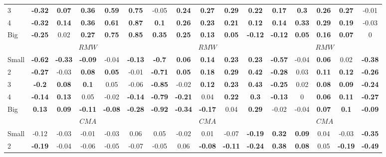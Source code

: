\begin{table}[H]
\begin{tabular}{lccccc|ccccc|ccccc}
3 & \textbf{-0.32} & \textbf{0.07} & \textbf{0.36} & \textbf{0.59} & \textbf{0.75} & -0.05 & \textbf{0.24} & \textbf{0.27} & \textbf{0.29} & \textbf{0.22} & \textbf{0.17} & \textbf{0.3} & \textbf{0.26} & \textbf{0.27} & -0.01 \\
4 & \textbf{-0.32} & \textbf{0.14} & \textbf{0.36} & \textbf{0.61} & \textbf{0.87} & \textbf{0.1} & \textbf{0.26} & \textbf{0.23} & \textbf{0.21} & \textbf{0.12} & \textbf{0.14} & \textbf{0.33} & \textbf{0.29} & \textbf{0.19} & -0.03 \\
Big & \textbf{-0.25} & 0.02 & \textbf{0.27} & \textbf{0.75} & \textbf{0.85} & \textbf{0.35} & \textbf{0.25} & \textbf{0.13} & \textbf{0.05} & \textbf{-0.12} & \textbf{-0.12} & \textbf{0.05} & \textbf{0.16} & \textbf{0.07} & 0 \\
 & \multicolumn{5}{c|}{$RMW$} & \multicolumn{5}{c|}{$RMW$} & \multicolumn{5}{c}{$RMW$} \\
Small & \textbf{-0.62} & \textbf{-0.33} & \textbf{-0.09} & -0.04 & \textbf{-0.13} & \textbf{-0.7} & \textbf{0.06} & \textbf{0.14} & \textbf{0.23} & \textbf{0.23} & \textbf{-0.57} & -0.04 & \textbf{0.06} & 0.02 & \textbf{-0.38} \\
2 & \textbf{-0.27} & -0.03 & \textbf{0.08} & \textbf{0.05} & -0.01 & \textbf{-0.71} & \textbf{0.05} & \textbf{0.18} & \textbf{0.29} & \textbf{0.42} & \textbf{-0.28} & 0.03 & \textbf{0.11} & \textbf{0.12} & \textbf{-0.26} \\
3 & \textbf{-0.2} & \textbf{0.08} & \textbf{0.1} & 0.05 & -0.06 & \textbf{-0.85} & -0.02 & \textbf{0.12} & \textbf{0.23} & \textbf{0.43} & \textbf{-0.25} & 0.02 & \textbf{0.08} & \textbf{0.09} & \textbf{-0.24} \\
4 & \textbf{-0.14} & \textbf{0.13} & 0.05 & -0.02 & \textbf{-0.14} & \textbf{-0.79} & \textbf{-0.21} & 0.04 & \textbf{0.22} & \textbf{0.3} & \textbf{-0.13} & 0 & \textbf{0.06} & \textbf{0.11} & \textbf{-0.27} \\
Big & \textbf{0.13} & \textbf{0.09} & \textbf{-0.11} & \textbf{-0.08} & \textbf{-0.28} & \textbf{-0.92} & \textbf{-0.34} & \textbf{-0.17} & 0.04 & \textbf{0.29} & -0.02 & -0.04 & \textbf{0.07} & \textbf{0.1} & \textbf{-0.09} \\
 & \multicolumn{5}{c|}{$CMA$} & \multicolumn{5}{c|}{$CMA$} & \multicolumn{5}{c}{$CMA$} \\
Small & -0.12 & -0.03 & -0.01 & -0.03 & 0.06 & 0.05 & -0.02 & 0.01 & -0.07 & \textbf{-0.19} & \textbf{0.32} & \textbf{0.09} & 0.04 & -0.03 & \textbf{-0.35} \\
2 & \textbf{-0.19} & -0.04 & -0.06 & -0.05 & -0.07 & -0.05 & 0.06 & \textbf{-0.08} & \textbf{-0.11} & \textbf{-0.24} & \textbf{0.38} & \textbf{0.08} & 0.05 & \textbf{-0.19} & \textbf{-0.49} \\

\end{tabular}
\end{table}
